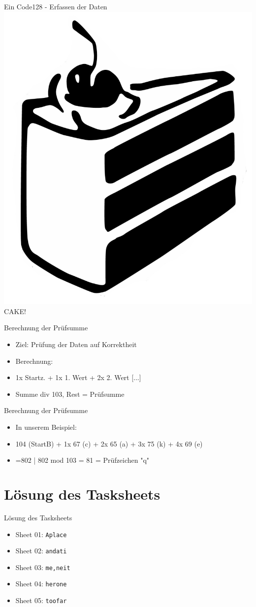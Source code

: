 \begin{frame}{Ein Code128 - Erfassen der Daten}
	\hfill\includegraphics[width=.35\textwidth]{muzy/cake.png}\hfill\hbox{}
	\hfill CAKE! \hfill\hbox{}
\end{frame}

\begin{frame}{Berechnung der Prüfsumme}
	\begin{itemize}
	\item Ziel: Prüfung der Daten auf Korrektheit
	\item Berechnung: 
	\item 1x Startz. + 1x 1. Wert + 2x 2. Wert [...]
	\item Summe div 103, Rest = Prüfsumme	
	\end{itemize}
\end{frame}

\begin{frame}{Berechnung der Prüfsumme}
	\begin{itemize}
	\item In unserem Beispiel:
	\item 104 (StartB) + 1x 67 (c) + 2x 65 (a) + 3x 75 (k) + 4x 69 (e)
	\item =802 | 802 mod 103 = 81 = Prüfzeichen "q"
	\end{itemize}
\end{frame}

\section{Lösung des Tasksheets}
\begin {frame}[<+->]{Lösung des Tasksheets}
	\begin{itemize}
	\item Sheet 01: \texttt{A\textvisiblespace{}place\textvisiblespace{}}
	\item Sheet 02: \texttt{and\textvisiblespace{}a\textvisiblespace{}ti}
	\item Sheet 03: \texttt{me,\textvisiblespace{}neit}
	\item Sheet 04: \texttt{her\textvisiblespace{}one\textvisiblespace{}}
	\item Sheet 05: \texttt{too\textvisiblespace{}far\textvisiblespace{}}
	\end{itemize}
\end{frame}

